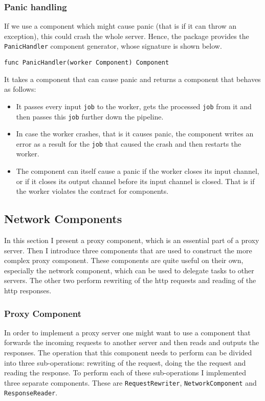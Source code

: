 \subsubsection{Panic handling}
If we use a component which might cause panic (that is if it can 
throw an exception), this could crash the whole server. 
Hence, the package provides the 
\texttt{PanicHandler} component generator, whose signature is shown 
below.
\begin{lstlisting}
func PanicHandler(worker Component) Component
\end{lstlisting}
It takes a component that can cause panic and returns a component that 
behaves as follows:
\begin{itemize}
	\item It passes every input \texttt{job} to the worker, gets the processed 
        \texttt{job} from it and then passes this \texttt{job} further down
        the pipeline.

	\item In case the worker crashes, that is it causes panic, the component 
        writes an error as a result for the \texttt{job} that caused the crash 
        and then restarts the worker.

	\item The component can itself cause a panic if the worker closes its 
        input channel, or if it closes its output channel before its input 
        channel is closed. That is if the worker violates the contract
        for components.
\end{itemize}

\newpage
\subsection{Network Components}
In this section I present a proxy component, which is an essential
part of a proxy server. Then I introduce three components that
are used to construct the more complex proxy component. These components
are quite useful on their own, especially the network component,
which can be used to delegate tasks to other servers. The other 
two perform rewriting of the http requests and reading of the http
responses.

\subsubsection{Proxy Component}
In order to implement a proxy server one might want to use
a component that forwards the incoming requests to another server
and then reads and outputs the responses. The operation that this
component needs to perform can be divided into three sub-operations: 
rewriting of the request, doing the the request and reading the 
response. To perform each of these sub-operations I implemented
three separate components. These are \texttt{RequestRewriter}, 
\texttt{NetworkComponent} and \texttt{ResponseReader}.


